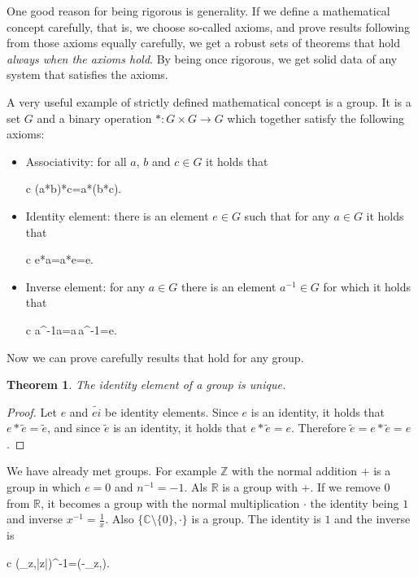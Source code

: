\documentclass[11pt,oneside,%
]{memoir}
\newenvironment{eqna}{\begin{IEEEeqnarray}{c}}{\end{IEEEeqnarray}\ignorespacesafterend}
\newtheorem{teoreema}{Theorem}
\newcommand{\RR}{\mathbb{R}}
\newcommand{\CC}{\mathbb{C}}
\newcommand{\ZZ}{\mathbb{Z}}
\begin{document}
One good reason for being rigorous is generality. If we define a mathematical concept carefully, that is, we choose so-called axioms, and prove results following from those axioms equally carefully, we get a robust sets of theorems that hold \emph{always when the axioms hold}. By being once rigorous, we get solid data of any system that satisfies the axioms.

A very useful example of strictly defined mathematical concept is a group. It is a set \(G\) and a binary operation \(*:G\times G\rightarrow G\) which together satisfy the following axioms:
\begin{itemize}
    \item Associativity: for all \(a\), \(b\) and \(c\in G\) it holds that
    \begin{eqna}
        (a*b)*c=a*(b*c).
    \end{eqna}
    \item Identity element: there is an element \(e\in G\) such that for any \(a\in G\) it holds that
    \begin{eqna}
        e*a=a*e=e.
    \end{eqna}
    \item Inverse element: for any \(a\in G\) there is an element \(a^{-1}\in G\) for which it holds that
    \begin{eqna}
        a^{-1}a=a\,a^{-1}=e.
    \end{eqna}
\end{itemize}
Now we can prove carefully results that hold for any group.
\begin{teoreema}
The identity element of a group is unique.
\end{teoreema}
\begin{proof}
Let \(e\) and \(\tilde{ei}\) be identity elements. Since \(e\) is an identity, it holds that \(e*\tilde{e}=\tilde{e}\), and since \(\tilde{e}\) is an identity, it holds that \(e*\tilde{e}=e\). Therefore \(\tilde{e}=e*\tilde{e}=e\).
\end{proof}

We have already met groups. For example \(\ZZ\) with the normal addition \(+\) is a group in which \(e=0\) and \(n^{-1}=-1\). Als \(\RR\) is a group with \(+\). If we remove \(0\) from \(\RR\), it becomes a group with the normal multiplication \(\cdot\) the identity being \(1\) and inverse \(x^{-1}=\frac{1}{x}\). Also \(\lbrace\CC\setminus\lbrace{0}\rbrace,\cdot\rbrace\) is a group. The identity is \(1\) and the inverse is
\begin{eqna}
    (\theta_z,|z|)^{-1}=(-\theta_z,).
\end{eqna}
\end{document}
